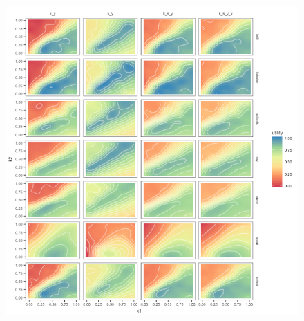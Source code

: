 \documentclass[preprint,12pt]{elsarticle}
\begin{document}
\begin{figure}[]\centering\includegraphics[width=5in]{util.png}\caption{}\label{fig:util}\end{figure}







\end{document}
